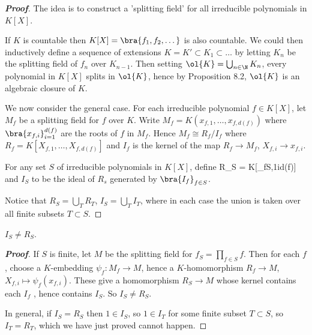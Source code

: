 \begin{proof}[\bf Proof]
The idea is to construct a 'splitting field' for all irreducible polynomials in $K[X]$.

If $K$ is countable then $K[X] = \bra{f_1, f_2, \dots }$ is also countable. We could then inductively define a sequence of extensions $K = K' \subset K_1 \subset \dots$ by letting $K_n$ be the splitting field of $f_n$ over $K_{n-1}$. Then setting $\ol{K} = \bigcup_{n\in \N} K_n$, every polynomial in $K[X]$ splits in $\ol{K}$, hence by Proposition 8.2, $\ol{K}$ is an algebraic closure of $K$.

We now consider the general case. For each irreducible polynomial $f \in K[X]$, let $M_f$ be a splitting field for $f$ over $K$. Write $M_f = K(x_{f,1}, \dots , x_{f,d(f)})$ where $\bra{x_{f,i}}^{d(f)}_{i=1}$ are the roots of $f$ in $M_f$. Hence $M_f \cong R_f /I_f$ where $R_f = K[X_{f,1}, \dots ,X_{f,d(f)}]$ and $I_f$ is the kernel of the map $R_f \to M_f$, $X_{f,i} \to x_{f,i}$.

For any set $S$ of irreducible polynomials in $K[X]$, define 
\be
R_S = K[_{f\in S,1\leq i\leq d(f)}]
\ee
and $I_S$ to be the ideal of $R_s$ generated by $\bra{I_f}_{f\in S}$.

Notice that $R_S = \bigcup_T R_T$, $I_S = \bigcup_T I_T$, where in each case the union is taken over all finite subsets $T \subset S$.
\end{proof}

\begin{lemma}
$I_S \neq R_S$.
\end{lemma}

\begin{proof}[\bf Proof]
If $S$ is finite, let $M$ be the splitting field for $f_S = \prod_{f\in S}f$. Then for each $f$, choose a $K$-embedding $\psi_f : M_f \to M$, hence a $K$-homomorphism $R_f \to M$, $X_{f,i} \mapsto \psi_f (x_{f,i})$. These give a homomorphism $R_S \to M$ whose kernel contains each $I_f$ , hence contains $I_S$. So $I_S \neq R_S$.

In general, if $I_S = R_S$ then $1 \in I_S$, so $1 \in I_T$ for some finite subset $T \subset S$, so $I_T = R_T$, which we have just proved cannot happen.
\end{proof}

